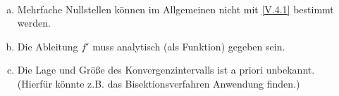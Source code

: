 \begin{Beme}~
  \begin{enumerate}[a)]
  \item Mehrfache Nullstellen können im Allgemeinen
    nicht mit \eqref{V.4.1} bestimmt werden.
  \item Die Ableitung $f'$ muss analytisch (als Funktion) gegeben sein.
  \item Die Lage und Größe des Konvergenzintervalls ist a priori unbekannt.\\
    (Hierfür könnte z.B. das Bisektionsverfahren Anwendung finden.)
  \end{enumerate}
\end{Beme}




